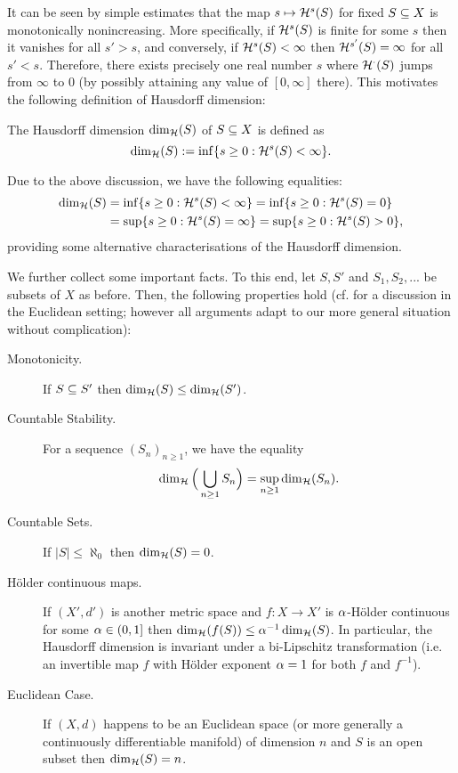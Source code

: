 It can be seen by simple estimates that the map $s\mapsto \mathcal{H}^s(S)$ for fixed $S\subseteq X$ is monotonically nonincreasing. More specifically, if $\mathcal{H}^s(S)$ is finite for some $s$ then it vanishes for all $s'>s$, and conversely, if $\mathcal{H}^s(S)<\infty$ then $\mathcal{H}^{s'}(S)=\infty$ for all $s'<s$. Therefore, there exists precisely one real number $s$ where $\mathcal{H}^\cdot(S)$ jumps from $\infty$ to $0$ (by possibly attaining any value of $[0,\infty]$ there). This motivates the following definition of Hausdorff dimension:
\begin{defin}
  The Hausdorff dimension $\dim_{\mathcal{H}}(S)$ of $S\subseteq X$ is defined as
  \[
    \dim_{\mathcal{H}}(S):=\inf\{s\geq0:\mathcal{H}^s(S)<\infty\}.
  \]
\end{defin}
Due to the above discussion, we have the following equalities:
\begin{align*}
   \dim_{\mathcal{H}}(S)&=\inf\{s\geq0:\mathcal{H}^s(S)<\infty\}=\inf\{s\geq0:\mathcal{H}^s(S)=0\}\\
           &=\sup\{s\geq0:\mathcal{H}^s(S)=\infty\}=\sup\{s\geq0:\mathcal{H}^s(S)>0\},
\end{align*}
providing some alternative characterisations of the Hausdorff dimension.

We further collect some important facts. To this end, let $S,S'$ and $S_1,S_2,...$ be subsets of $X$ as before. Then, the following properties hold (cf. \cite[p.32f]{falconer2007fractal} for a discussion in the Euclidean setting; however all arguments adapt to our more general situation without complication):
\begin{description}
  \item[Monotonicity.] If $S\subseteq S'$ then $\dim_{\mathcal{H}}(S)\leq\dim_{\mathcal{H}}(S')$. 
  \item[Countable Stability.] For a sequence $(S_n)_{n\geq1}$, we have the equality
  \[ 
    \dim_{\mathcal{H}}\Big(\bigcup_{n\geq1}S_n\Big)=\sup_{n\geq1} \dim_{\mathcal{H}}(S_n).
  \]
  \item[Countable Sets.] If $|S|\leq\aleph_0$ then $\dim_{\mathcal{H}}(S)=0$.
  \item[H\"older continuous maps.] If $(X',d')$ is another metric space and $f:X\to X'$ is $\alpha$-H\"older continuous for some $\alpha\in(0,1]$ then $\dim_{\mathcal{H}}(f(S))\leq \alpha^{-1}\dim_{\mathcal{H}}(S)$. In particular, the Hausdorff dimension is invariant under a bi-Lipschitz transformation (i.e. an invertible map $f$ with H\"older exponent $\alpha=1$ for both $f$ and $f^{-1}$).
  \item[Euclidean Case.] If $(X,d)$ happens to be an Euclidean space (or more generally a continuously differentiable manifold) of dimension $n$ and $S$ is an open subset then $\dim_{\mathcal{H}}(S)=n$.
\end{description}

